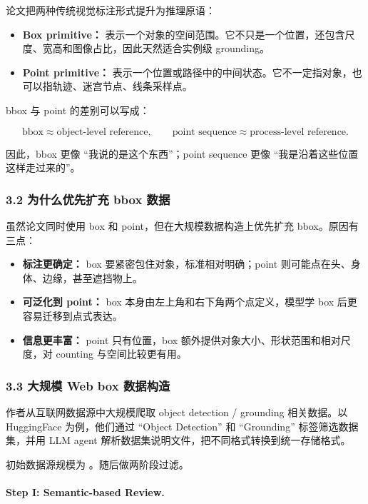 论文把两种传统视觉标注形式提升为推理原语：

\begin{itemize}[leftmargin=1.5em]
  \item \textbf{Box primitive：} 表示一个对象的空间范围。它不只是一个位置，还包含尺度、宽高和图像占比，因此天然适合实例级 grounding。
  \item \textbf{Point primitive：} 表示一个位置或路径中的中间状态。它不一定指对象，也可以指轨迹、迷宫节点、线条采样点。
\end{itemize}

bbox 与 point 的差别可以写成：

\[
\text{bbox} \approx \text{object-level reference},
\qquad
\text{point sequence} \approx \text{process-level reference}.
\]

因此，bbox 更像 ``我说的是这个东西''；point sequence 更像 ``我是沿着这些位置这样走过来的''。

\subsubsection{3.2 为什么优先扩充 bbox 数据}

虽然论文同时使用 box 和 point，但在大规模数据构造上优先扩充 bbox。原因有三点：

\begin{itemize}[leftmargin=1.5em]
  \item \textbf{标注更确定：} box 要紧密包住对象，标准相对明确；point 则可能点在头、身体、边缘，甚至遮挡物上。
  \item \textbf{可泛化到 point：} box 本身由左上角和右下角两个点定义，模型学 box 后更容易迁移到点式表达。
  \item \textbf{信息更丰富：} point 只有位置，box 额外提供对象大小、形状范围和相对尺度，对 counting 与空间比较更有用。
\end{itemize}

\subsubsection{3.3 大规模 Web box 数据构造}

作者从互联网数据源中大规模爬取 object detection / grounding 相关数据。以 HuggingFace 为例，他们通过 ``Object Detection'' 和 ``Grounding'' 标签筛选数据集，并用 LLM agent 解析数据集说明文件，把不同格式转换到统一存储格式。

初始数据源规模为 。随后做两阶段过滤。

\paragraph{Step I: Semantic-based Review.}

